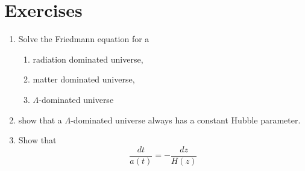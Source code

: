 \section{Exercises}



\begin{enumerate}
\item Solve the Friedmann equation for a
  \begin{enumerate}
  \item radiation dominated universe,
  \item matter dominated universe,
  \item $\Lambda$-dominated universe
  \end{enumerate}

\item show that a $\Lambda$-dominated universe always has a constant Hubble parameter.

\item Show that
  $$ \frac{dt}{a(t)} = - \frac{dz}{H(z)} $$

\end{enumerate}
